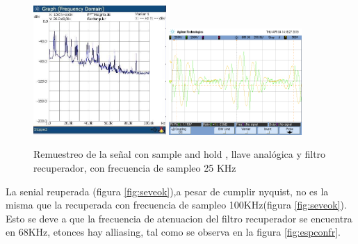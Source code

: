 \documentclass[../../ASSD_TP1_G7.tex]{subfiles}
\begin{document}
\begin{figure}[H]
\centering
{}

{\includegraphics[width=0.45\textwidth]{figures/confr.jpeg}} 
{\includegraphics[width=0.45\textwidth]{figures/scope1.png}}
\caption{Remuestreo de la se\~nal con sample and hold , llave analógica y filtro recuperador, con frecuencia de sampleo 25 KHz}
\end{figure}

La senial reuperada (figura \ref{fig:seveok}),a pesar de cumplir nyquist, no es la misma que la recuperada con frecuencia de sampleo 100KHz(figura \ref{fig:seveok}). Esto se deve a que la frecuencia de atenuacion del filtro recuperador se encuentra en 68KHz, etonces hay alliasing, tal como se observa en la figura \ref{fig:espconfr}.
\end{document}
